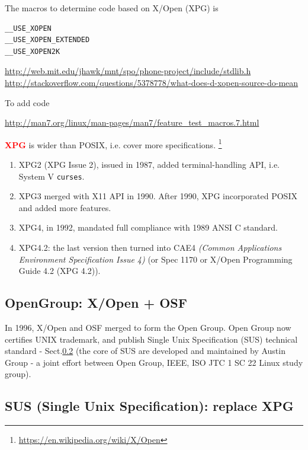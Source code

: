 \begin{mdframed}

The macros to determine code based on X/Open (XPG) is
\begin{verbatim}
__USE_XOPEN
__USE_XOPEN_EXTENDED
__USE_XOPEN2K
\end{verbatim}
\url{http://web.mit.edu/jhawk/mnt/spo/phone-project/include/stdlib.h}
\url{http://stackoverflow.com/questions/5378778/what-does-d-xopen-source-do-mean}

To add code 

\url{http://man7.org/linux/man-pages/man7/feature_test_macros.7.html}
\end{mdframed}

\textcolor{red}{\bf XPG} is wider than POSIX, i.e. cover more specifications.
\footnote{\url{https://en.wikipedia.org/wiki/X/Open}}
\begin{enumerate}
  \item XPG2 (XPG Issue 2), issued in 1987, added terminal-handling API,
  i.e. System V \verb!curses!. 

  \item XPG3 merged with X11 API in 1990. After 1990, XPG
incorporated POSIX and added more features. 

  \item XPG4, in 1992, mandated full compliance with 1989 ANSI C standard. 
  
  \item XPG4.2: the last version then turned into CAE4 {\it (Common Applications
  Environment Specification Issue 4)} (or Spec 1170 or X/Open Programming Guide
  4.2 (XPG 4.2)).
\end{enumerate}

\subsection{OpenGroup: X/Open + OSF}

In 1996, X/Open and OSF merged to form the Open Group. Open Group now certifies
UNIX trademark, and publish Single Unix Specification (SUS) technical standard -
Sect.\ref{sec:SUS} (the core of SUS are developed and maintained by Austin Group
- a joint effort between Open Group, IEEE, ISO JTC 1 SC 22 Linux study group).




\subsection{SUS (Single Unix Specification): replace XPG}
\label{sec:SUS}

